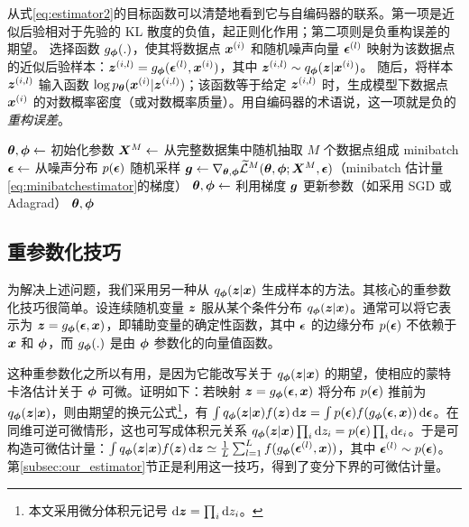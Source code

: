 从式\eqref{eq:estimator2}的目标函数可以清楚地看到它与自编码器的联系。第一项是近似后验相对于先验的 KL 散度的负值，起正则化作用；第二项则是负重构误差的期望。
选择函数 $g_{\bm{\phi}}(.)$，使其将数据点 $\bm{x}^{(i)}$ 和随机噪声向量 $\bm{\epsilon}^{(l)}$ 映射为该数据点的近似后验样本：$\bm{z}^{(i,l)} = g_{\bm{\phi}}(\bm{\epsilon}^{(l)}, \bm{x}^{(i)})$，其中 $\bm{z}^{(i,l)} \sim q_{\bm{\phi}}(\bm{z}|\bm{x}^{(i)})$。
随后，将样本 $\bm{z}^{(i,l)}$ 输入函数 $\log p_{\bm{\theta}}(\bm{x}^{(i)}|\bm{z}^{(i,l)})$；该函数等于给定 $\bm{z}^{(i,l)}$ 时，生成模型下数据点 $\bm{x}^{(i)}$ 的对数概率密度（或对数概率质量）。用自编码器的术语说，这一项就是负的\emph{重构误差}。

\begin{algorithm}[t]
\caption{自编码变分贝叶斯（AEVB）算法的 minibatch 版本。第\ref{subsec:our_estimator}节的两种 SGVB 估计量均可使用。实验中取 $M=100$、$L=1$。}
\renewcommand{\algorithmicforall}{\textbf{对每个}}
\begin{algorithmic}
\State $\bm{\theta}, \bm{\phi} \gets$ 初始化参数
\Repeat
\State $\bm{X}^M \gets $ 从完整数据集中随机抽取 $M$ 个数据点组成 minibatch
\State $\bm{\epsilon} \gets $ 从噪声分布 $p(\bm{\epsilon})$ 随机采样
\State $\bm{g} \gets \nabla_{\bm{\theta},\bm{\phi}} \widetilde{\mathcal{L}}^{M}(\bm{\theta},\bm{\phi}; \bm{X}^M,\bm{\epsilon})$（minibatch 估计量\eqref{eq:minibatchestimator}的梯度）
\State $\bm{\theta}, \bm{\phi} \gets $ 利用梯度 $\bm{g}$ 更新参数（如采用 SGD 或 Adagrad\cite{duchi2010adaptive}）
\State \Return $\bm{\theta}, \bm{\phi}$
\end{algorithmic}
\label{algorithm}
\end{algorithm}

\subsection{重参数化技巧}
\label{subsec:thetrick}



为解决上述问题，我们采用另一种从 $q_{\bm{\phi}}(\bm{z}|\bm{x})$ 生成样本的方法。其核心的重参数化技巧很简单。设连续随机变量 $\bm{z}$ 服从某个条件分布 $q_{\bm{\phi}}(\bm{z}|\bm{x})$。通常可以将它表示为 $\bm{z} = g_{\bm{\phi}}(\bm{\epsilon}, \bm{x})$，即辅助变量的确定性函数，其中 $\bm{\epsilon}$ 的边缘分布 $p(\bm{\epsilon})$ 不依赖于 $\bm{x}$ 和 $\bm{\phi}$，而 $g_{\bm{\phi}}(.)$ 是由 $\bm{\phi}$ 参数化的向量值函数。

这种重参数化之所以有用，是因为它能改写关于 $q_{\bm{\phi}}(\bm{z}|\bm{x})$ 的期望，使相应的蒙特卡洛估计关于 $\bm{\phi}$ 可微。证明如下：若映射 $\bm{z}=g_{\bm{\phi}}(\bm{\epsilon},\bm{x})$ 将分布 $p(\bm{\epsilon})$ 推前为 $q_{\bm{\phi}}(\bm{z}|\bm{x})$，则由期望的换元公式\footnote{本文采用微分体积元记号 $\mathrm{d}\bm{z}=\prod_i\mathrm{d}z_i$。}，有 $\int q_{\bm{\phi}}(\bm{z}|\bm{x})f(\bm{z})\,\mathrm{d}\bm{z}=\int p(\bm{\epsilon})f(g_{\bm{\phi}}(\bm{\epsilon},\bm{x}))\,\mathrm{d}\bm{\epsilon}$。在同维可逆可微情形，这也可写成体积元关系 $q_{\bm{\phi}}(\bm{z}|\bm{x})\prod_i\mathrm{d}z_i=p(\bm{\epsilon})\prod_i\mathrm{d}\epsilon_i$。于是可构造可微估计量：$\int q_{\bm{\phi}}(\bm{z}|\bm{x})f(\bm{z})\,\mathrm{d}\bm{z}\simeq\frac{1}{L}\sum_{l=1}^L f(g_{\bm{\phi}}(\bm{\epsilon}^{(l)},\bm{x}))$，其中 $\bm{\epsilon}^{(l)}\sim p(\bm{\epsilon})$。第\ref{subsec:our_estimator}节正是利用这一技巧，得到了变分下界的可微估计量。

